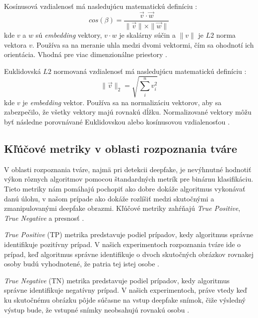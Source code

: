 Kosínusová vzdialenosť má nasledujúcu matematickú definíciu \cite{distance_embedding}:
\begin{equation}
    cos(\beta) = \frac{\overrightarrow{v} \cdot \overrightarrow{w}}{\|\overrightarrow{v}\| \times \|\overrightarrow{w}\|}
    \label{eq:cos_dis}
\end{equation}
kde $v$ a $w$ sú \textit{embedding} vektory, $v \cdot w$ je skalárny súčin a $\|v\|$ je $L2$ norma vektora $v$. Používa sa na meranie uhla medzi dvomi vektormi, čím sa ohodnotí ich orientácia. Vhodná pre viac dimenzionálne priestory \cite{distance_embedding}.

Euklidovská $L2$ normovaná vzdialenosť má nasledujúcu matematickú definíciu \cite{wolfram}:
\begin{equation}
    \|\overrightarrow{v}\|_2 = \sqrt{\sum_{i}^{n} v_i^2}
    \label{eq:l2norm_dis}
\end{equation}
kde $v$ je \textit{embedding} vektor. Používa sa na normalizáciu vektorov, aby sa zabezpečilo, že všetky vektory majú rovnakú dĺžku. Normalizované vektory môžu byť následne porovnávané Euklidovskou alebo kosínusovou vzdialenosťou \cite{wolfram,l2norm}.

\subsection{Kľúčové metriky v oblasti rozpoznania tváre} \label{metrics}
V oblasti rozpoznania tváre, najmä pri detekcii deepfake, je nevýhnutné hodnotiť výkon rôznych algoritmov pomocou štandardných metrík pre binárnu klasifikáciu. Tieto metriky nám pomáhajú pochopiť ako dobre dokáže algoritmus vykonávať danú úlohu, v našom prípade ako dokáže rozlíšiť medzi skutočnými a zmanipulovanými deepfake obrazmi. Kľúčové metriky zahŕňajú \textit{True Positive}, \textit{True Negative} a presnosť \cite{TP_TN}.

\textit{True Positive} (TP) metrika predstavuje podiel prípadov, kedy algoritmus správne identifikuje pozitívny prípad. V našich experimentoch rozpoznania tváre ide o prípad, keď algoritmus správne identifikuje o dvoch skutočných obrázkov rovnakej osoby budú vyhodnotené, že patria tej istej osobe \cite{TP_TN}.

\textit{True Negative} (TN) metrika predstavuje podiel prípadov, kedy algoritmus správne identifikuje negatívny prípad. V našich experimentoch, práve vtedy keď ku skutočnému obrázku pôjde súčasne na vstup deepfake snímok, čiže výsledný výstup bude, že vstupné snímky neobsahujú rovnakú osobu \cite{TP_TN}. 


